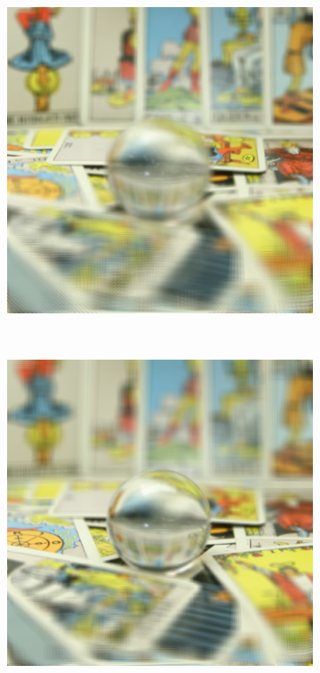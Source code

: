 \documentclass[11pt,a4paper,titlepage]{article}
\begin{document}
\begin{figure}
\begin{subfigure}[t]{0.19\textwidth}
		\includegraphics[width=\textwidth]{results/tarot_back_projection/sensorPlaneZ=-0.5/Back_Projection_layer_2.png} 
	\end{subfigure}%
	~
	\begin{subfigure}[t]{0.19\textwidth}
		\includegraphics[width=\textwidth]{results/tarot_back_projection/sensorPlaneZ=-0.5/Back_Projection_layer_3.png} 

\end{subfigure}
\end{figure}
\end{document}
